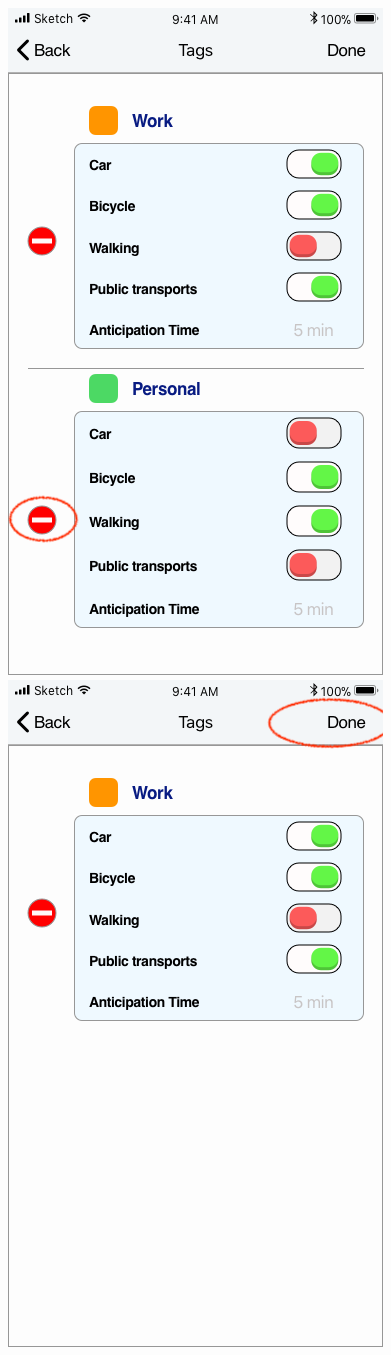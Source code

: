 \begin{figure}[H]
	\includegraphics[scale=0.23]{Images/Interface/Tags/6_tags_deletion}
	\hspace{0.5cm}
	\includegraphics[scale=0.23]{Images/Interface/Tags/7_tags_deletion_2}

\end{figure}

